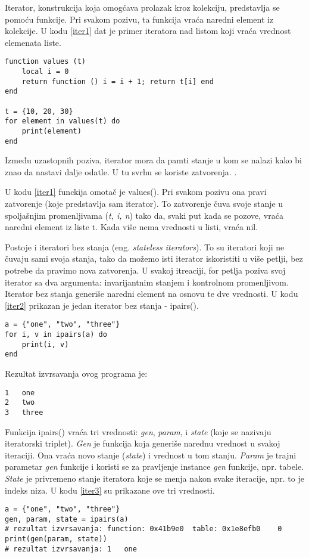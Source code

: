 \documentclass[a4paper]{article}
\begin{document}

Iterator, konstrukcija koja omogćava prolazak kroz kolekciju, predstavlja se pomoću funkcije. Pri svakom pozivu, ta funkcija vraća naredni element iz kolekcije. U kodu \ref{iter1} dat je primer iteratora nad listom koji vraća vrednost elemenata liste.

\begin{lstlisting}[caption={Primer iteratora nad listom},frame=single, label=iter1]
function values (t)
	local i = 0
	return function () i = i + 1; return t[i] end
end

t = {10, 20, 30}
for element in values(t) do
	print(element)
end
\end{lstlisting}

Između uzastopnih poziva, iterator mora da pamti stanje u kom se nalazi kako bi znao da nastavi dalje odatle. U tu svrhu se koriste zatvorenja. \cite{lua_org_iterators}.

U kodu \ref{iter1} funckija omotač je values(). Pri svakom pozivu ona pravi zatvorenje (koje predstavlja sam iterator). To zatvorenje čuva svoje stanje u spoljašnjim promenljivama (\textit{t, i, n}) tako da, svaki put kada se pozove, vraća naredni element iz liste t. Kada više nema vrednosti u listi, vraća nil.

Postoje i iteratori bez stanja (eng. \textit{stateless iterators}). To su iteratori koji ne čuvaju sami svoja stanja, tako da možemo isti iterator iskoristiti u više petlji, bez potrebe da pravimo nova zatvorenja. U svakoj itreaciji, for petlja poziva svoj iterator sa dva argumenta: invarijantnim stanjem i kontrolnom promenljivom. Iterator bez stanja generiše naredni element na osnovu te dve vrednosti. U kodu \ref{iter2} prikazan je jedan iterator bez stanja - ipairs()\cite{bookProgInLua}.

\begin{lstlisting}[caption={Primer iteratora bez stanja},frame=single, label=iter2]
a = {"one", "two", "three"}
for i, v in ipairs(a) do
	print(i, v)
end
\end{lstlisting}
Rezultat izvrsavanja ovog programa je:
\begin{verbatim}
1	one
2	two
3	three
\end{verbatim}
Funkcija ipairs() vraća tri vrednosti: \textit{gen}, \textit{param}, i \textit{state} (koje se nazivaju iteratorski triplet). \textit{Gen} je funkcija koja generiše narednu vrednost u svakoj iteraciji. Ona vraća novo stanje (\textit{state}) i vrednost u tom stanju. \textit{Param} je trajni parametar \textit{gen} funkcije i koristi se za pravljenje instance \textit{gen} funkcije, npr. tabele. \textit{State} je privremeno stanje iteratora koje se menja nakon svake iteracije, npr. to je indeks niza\cite{luafun}. U kodu \ref{iter3} su prikazane ove tri vrednosti.
\begin{lstlisting}[caption={Primer iteratora bez stanja (nastavak)},frame=single, label=iter3]
a = {"one", "two", "three"}
gen, param, state = ipairs(a)
# rezultat izvrsavanja: function: 0x41b9e0	table: 0x1e8efb0	0
print(gen(param, state))
# rezultat izvrsavanja: 1	one
\end{lstlisting}
\end{document}

